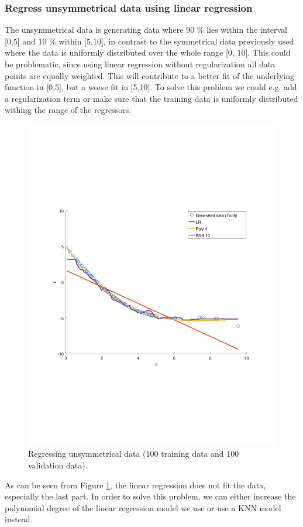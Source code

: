 \documentclass[]{article}
\begin{document}
\subsubsection{Regress unsymmetrical data using linear regression}
The unsymmetrical data is generating data where 90 \% lies within the interval [0,5] and 10 \% within [5,10], in contrast to the symmetrical data previously used where the data is uniformly distributed over the whole range [0, 10]. This could be problematic, since using linear regression without regularization all data points are equally weighted. This will contribute to a better fit of the underlying function in [0,5], but a worse fit in [5,10]. To solve this problem we could e.g. add a regularization term or make sure that the training data is uniformly distributed withing the range of the regressors.
\begin{figure}[ht]
	\centering
	\includegraphics[trim= 10cm 5cm 10cm 5cm, scale=0.4]{proj1-3_2c}
	\caption{Regressing unsymmetrical data (100 training data and 100 validation data).}
	\label{fig:unsymmetrical}
\end{figure}
As can be seen from Figure \ref{fig:unsymmetrical}, the linear regression does not fit the data, especially the last part. In order to solve this problem, we can either increase the polynomial degree of the linear regression model we use or use a KNN model instead.
\end{document}

